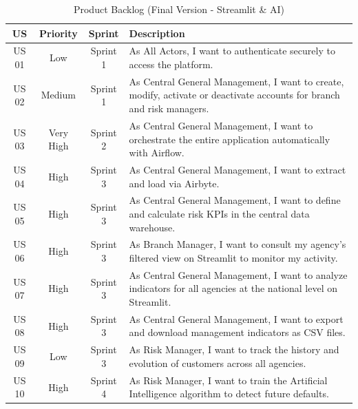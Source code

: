 \begin{table}[H]
\centering
\caption{Product Backlog (Final Version - Streamlit \& AI)}
\label{tab:atb_product_backlog}

\small
\renewcommand{\arraystretch}{1.4}

\begin{tabularx}{\textwidth}{|c|c|c|X|}
\hline
\rowcolor{blue!15}
\textbf{US} & \textbf{Priority} & \textbf{Sprint} & \textbf{Description} \\
\hline

US 01 & Low & Sprint 1 &
As All Actors, I want to authenticate securely to access the platform. \\
\hline

US 02 & Medium & Sprint 1 &
As Central General Management, I want to create, modify, activate or deactivate accounts for branch and risk managers. \\
\hline

US 03 & Very High & Sprint 2 &
As Central General Management, I want to orchestrate the entire application automatically  with Airflow. \\
\hline

US 04 & High & Sprint 3 &
As Central General Management, I want to extract and load via Airbyte. \\
\hline

US 05 & High & Sprint 3 &
As Central General Management, I want to define and calculate risk KPIs in the central data warehouse. \\
\hline

US 06 & High & Sprint 3 &
As Branch Manager, I want to consult my agency's filtered view on Streamlit to monitor my activity. \\
\hline

US 07 & High & Sprint 3 &
As Central General Management, I want to analyze indicators for all agencies at the national level on Streamlit. \\
\hline

US 08 & High & Sprint 3 &
As Central General Management, I want to export and download management indicators as CSV files. \\
\hline

US 09 & Low & Sprint 3 &
As Risk Manager, I want to track the history and evolution of customers across all agencies. \\
\hline

US 10 & High & Sprint 4 &
As Risk Manager, I want to train the Artificial Intelligence algorithm to detect future defaults. \\
\hline


\end{tabularx}
\end{table}

